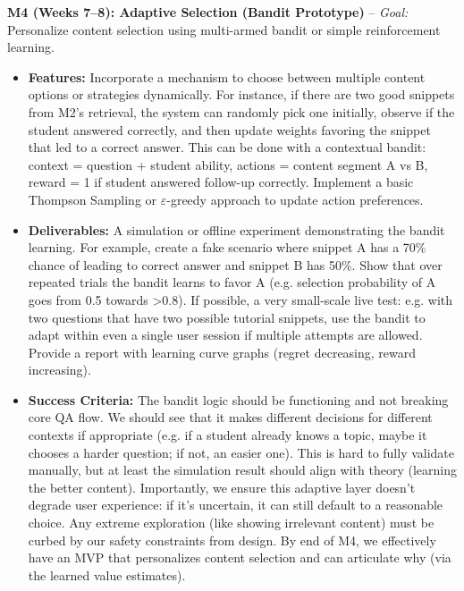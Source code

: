 \documentclass[11pt]{article}
\begin{document}
\textbf{M4 (Weeks 7–8): Adaptive Selection (Bandit Prototype)} – \textit{Goal:} Personalize content selection using multi-armed bandit or simple reinforcement learning.
  \begin{itemize}
    \item \textbf{Features:} Incorporate a mechanism to choose between multiple content options or strategies dynamically. For instance, if there are two good snippets from M2’s retrieval, the system can randomly pick one initially, observe if the student answered correctly, and then update weights favoring the snippet that led to a correct answer. This can be done with a contextual bandit: context = question + student ability, actions = content segment A vs B, reward = 1 if student answered follow-up correctly. Implement a basic Thompson Sampling or $\varepsilon$-greedy approach to update action preferences.
    \item \textbf{Deliverables:} A simulation or offline experiment demonstrating the bandit learning. For example, create a fake scenario where snippet A has a 70\% chance of leading to correct answer and snippet B has 50\%. Show that over repeated trials the bandit learns to favor A (e.g. selection probability of A goes from 0.5 towards >0.8). If possible, a very small-scale live test: e.g. with two questions that have two possible tutorial snippets, use the bandit to adapt within even a single user session if multiple attempts are allowed. Provide a report with learning curve graphs (regret decreasing, reward increasing).
    \item \textbf{Success Criteria:} The bandit logic should be functioning and not breaking core QA flow. We should see that it makes different decisions for different contexts if appropriate (e.g. if a student already knows a topic, maybe it chooses a harder question; if not, an easier one). This is hard to fully validate manually, but at least the simulation result should align with theory (learning the better content). Importantly, we ensure this adaptive layer doesn’t degrade user experience: if it’s uncertain, it can still default to a reasonable choice. Any extreme exploration (like showing irrelevant content) must be curbed by our safety constraints from design. By end of M4, we effectively have an MVP that personalizes content selection and can articulate why (via the learned value estimates).
  \end{itemize}
\end{document}
